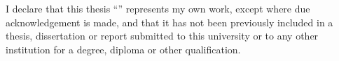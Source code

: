 \begin{declaration}
I declare that this thesis “\hku@reporttitle” represents my own work, except where due acknowledgement is made, and that it has not been previously included in a thesis, dissertation or report submitted to this university or to any other institution for a degree, diploma or other qualification.
\end{declaration}
